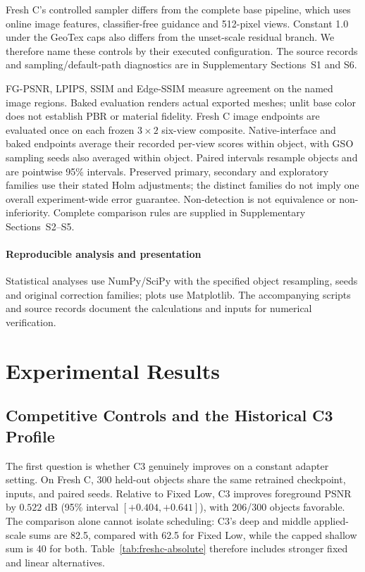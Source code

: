 \documentclass[times,twocolumn,final]{elsarticle}
\begin{document}
Fresh C's controlled sampler differs from the complete base pipeline, which uses online image features, classifier-free guidance and 512-pixel views. Constant 1.0 under the GeoTex caps also differs from the unset-scale residual branch. We therefore name these controls by their executed configuration. The source records and sampling/default-path diagnostics are in Supplementary Sections~S1 and S6.

FG-PSNR, LPIPS, SSIM and Edge-SSIM measure agreement on the named image regions. Baked evaluation renders actual exported meshes; unlit base color does not establish PBR or material fidelity. Fresh C image endpoints are evaluated once on each frozen $3\times2$ six-view composite. Native-interface and baked endpoints average their recorded per-view scores within object, with GSO sampling seeds also averaged within object. Paired intervals resample objects and are pointwise 95\% intervals. Preserved primary, secondary and exploratory families use their stated Holm adjustments; the distinct families do not imply one overall experiment-wide error guarantee. Non-detection is not equivalence or non-inferiority. Complete comparison rules are supplied in Supplementary Sections~S2--S5.

\paragraph{Reproducible analysis and presentation}
Statistical analyses use NumPy/SciPy with the specified object resampling, seeds and original correction families; plots use Matplotlib. The accompanying scripts and source records document the calculations and inputs for numerical verification.

\section{Experimental Results}
\label{sec:experiments}

\subsection{Competitive Controls and the Historical C3 Profile}
\label{subsec:largescale}

The first question is whether C3 genuinely improves on a constant adapter setting. On Fresh C, 300 held-out objects share the same retrained checkpoint, inputs, and paired seeds. Relative to Fixed Low, C3 improves foreground PSNR by $0.522$ dB (95\% interval $[+0.404,+0.641]$), with 206/300 objects favorable. The comparison alone cannot isolate scheduling: C3's deep and middle applied-scale sums are 82.5, compared with 62.5 for Fixed Low, while the capped shallow sum is 40 for both. Table~\ref{tab:freshc-absolute} therefore includes stronger fixed and linear alternatives.
\end{document}

